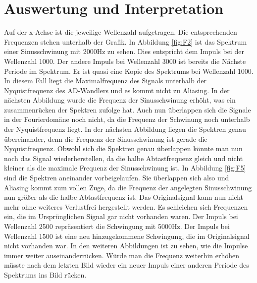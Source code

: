 \section{Auswertung und Interpretation}
\label{chap:V5_AUSWERTUNGUNDINTERPRETATION5}
Auf der x-Achse ist die jeweilige Wellenzahl aufgetragen. Die entsprechenden Frequenzen stehen unterhalb der Grafik. In Abbildung \ref{fig:F2} ist das Spektrum einer Sinusschwinung mit 2000Hz zu sehen. Dies entspricht dem Impuls bei der Wellenzahl 1000. Der andere Impuls bei Wellenzahl 3000 ist bereits die Nächste Periode im Spektrum. Er ist quasi eine Kopie des Spektrums bei Wellenzahl 1000. In diesem Fall liegt die Maximalfrequenz des Signals unterhalb der Nyquistfrequenz des AD-Wandlers und es kommt nicht zu Aliasing.
In der nächsten Abbildung wurde die Frequenz der Sinusschwinung erhöht, was ein zusammenrücken der Spektren zufolge hat. Auch nun überlappen sich die Signale in der Fourierdomäne noch nicht, da die Frequenz der Schwinung noch unterhalb der Nyquistfrequenz liegt.
In der nächsten Abbildung liegen die Spektren genau übereinander, denn die Frequenz der Sinusschwinung ist gerade die Nyquistfrequenz. Obwohl sich die Spektren genau überlappen könnte man nun noch das Signal wiederherstellen, da die halbe Abtastfrequenz gleich und nicht kleiner als die maximale Frequenz der Sinusschwinung ist. 
In Abbildung \ref{fig:F5} sind die Spektren aneinander vorbeigelaufen. Sie überlappen sich also und Aliasing kommt zum vollen Zuge, da die Frequenz der angelegten Sinusschwinung nun größer als die halbe Abtastfrequenz ist. Das Originalsignal kann nun nicht mehr ohne weiteres Verlustfrei hergestellt werden. Es schleichen sich Frequenzen ein, die im Ursprünglichen Signal gar nicht vorhanden waren.
Der Impuls bei Wellenzahl 2500 repräsentiert die Schwingung mit 5000Hz.  Der Impuls bei Wellenzahl 1500 ist eine neu hinzugekommene Schwingung, die im Originalsignal nicht vorhanden war.
In den weiteren Abbildungen ist zu sehen, wie die Impulse immer weiter auseinanderrücken. Würde man die Frequenz weiterhin erhöhen müsste nach dem letzten Bild wieder ein neuer Impuls einer anderen Periode des Spektrums ins Bild rücken.
 